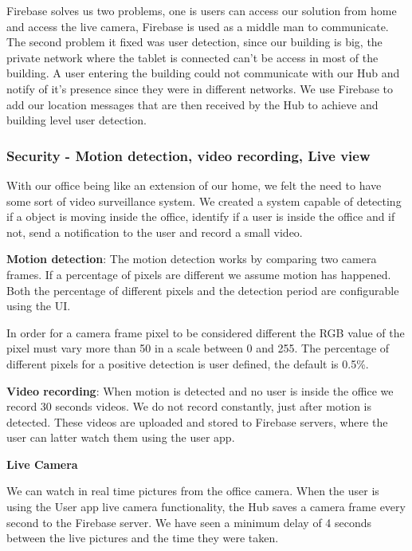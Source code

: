 \documentclass[conference]{IEEEtran}
\begin{document}
Firebase solves us two problems, one is users can access our solution from home and access the live camera, Firebase is used as a middle man to communicate. The second problem it fixed was user detection, since our building is big, the private network where the tablet is connected can't be access in most of the building. A user entering the building could not communicate with our Hub and notify of it's presence since they were in different networks. We use Firebase to add our location messages that are then received by the Hub to achieve and building level user detection.

\subsubsection{Security - Motion detection, video recording, Live view}\label{imp:security_motion}

With our office being like an extension of our home, we felt the need to have some sort of video surveillance system. We created a system capable of detecting if a object is moving inside the office, identify if a user is inside the office and if not, send a notification to the user and record a small video.

\textbf{Motion detection}: The motion detection works by comparing two camera frames. If a percentage of pixels are different we assume motion has happened. Both the percentage of different pixels and the detection period are configurable using the \ac{UI}.

In order for a camera frame pixel to be considered different the RGB value of the pixel must vary more than 50 in a scale between 0 and 255. The percentage of different pixels for a positive detection is user defined, the default is 0.5\%.


\textbf{Video recording}: When motion is detected and no user is inside the office we record 30 seconds videos. We do not record constantly, just after motion is detected. These videos are uploaded and stored to Firebase servers, where the user can latter watch them using the user app.

\textbf{Live Camera}

We can watch in real time pictures from the office camera. When the user is using the User app live camera functionality, the Hub saves a camera frame every second to the Firebase server. We have seen a minimum delay of 4 seconds between the live pictures and the time they were taken.
\end{document}
